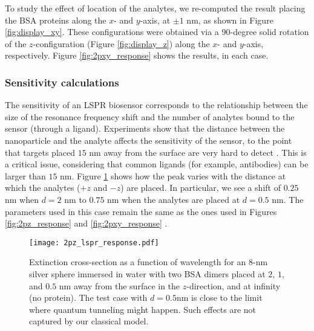 To study the effect of location of the analytes, we re-computed the result placing the 
BSA proteins along the $x$- and $y$-axis, at $\pm 1$ nm, as shown in Figure \ref{fig:display_xy}.
These configurations were obtained via a 90-degree solid rotation of the $z$-configuration (Figure \ref{fig:display_z}) along the $x$- and $y$-axis, respectively.
Figure \ref{fig:2pxy_response} shows the results, in each case.  


\subsubsection{Sensitivity calculations} \label{sec:bsa_sensitivity}

The sensitivity of an LSPR biosensor corresponds to the relationship between the size 
of the resonance frequency shift and the number of analytes bound to the sensor (through a ligand).
Experiments show that the distance between the nanoparticle and the analyte 
affects the sensitivity of the sensor, to the point that
targets placed $15$ nm away from the surface are very hard to detect \cite{HaesETal2004}.
This is a critical issue, considering that common ligands (for example, antibodies) can be
larger than $15$ nm. Figure \ref{fig:dist_response} 
shows how the peak varies with the distance at which the analytes ($+z$ and $-z$) are placed.  
In particular, we see a shift of $0.25$ nm when $d=2$ nm to $0.75$ nm when the 
analytes are placed at $d=0.5$ nm. The parameters used in this case remain 
the same as the ones used in Figures \ref{fig:2pz_response} and \ref{fig:2pxy_response} .


\begin{figure}%
   \centering
   \texttt{[image: 2pz\_lspr\_response.pdf]} 
   \caption{Extinction cross-section as a function of wavelength for an $8$-nm
            silver sphere immersed in water with two BSA dimers placed at
            $2$, $1$, and $0.5$ nm away from the surface in the 
            $z$-direction, and at infinity (no protein). The test case with $d=0.5$nm is close to the limit where quantum tunneling might happen. Such effects are not captured by our classical model.}
   \label{fig:dist_response}
\end{figure}




